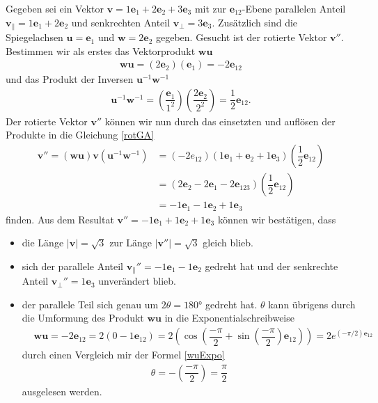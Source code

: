 \begin{beispiel} 
	Gegeben sei ein Vektor $\mathbf{v} = 1\mathbf{e}_1 + 2\mathbf{e}_2 + 3\mathbf{e}_3$ mit zur $\mathbf{e}_{12}$-Ebene parallelen Anteil $\mathbf{v_\parallel} = 1\mathbf{e}_1 + 2\mathbf{e}_2$ und senkrechten Anteil $\mathbf{v_\perp} = 3\mathbf{e}_3$. Zusätzlich sind die Spiegelachsen $\mathbf{u} = \mathbf{e}_1$ und $\mathbf{w} = 2\mathbf{e}_2$ gegeben. Gesucht ist der rotierte Vektor $\mathbf{v}''$. Bestimmen wir als erstes das Vektorprodukt $\mathbf{wu}$
	\begin{align}
		\mathbf{wu} = (2\mathbf{e}_2)(\mathbf{e}_1) = -2\mathbf{e}_{12}
	\end{align}
	und das Produkt der Inversen $\mathbf{u}^{-1}\mathbf{w}^{-1}$
	\begin{align}
		\mathbf{u}^{-1}\mathbf{w}^{-1} = (\dfrac{\mathbf{e}_1}{1^2})(\dfrac{2\mathbf{e}_2}{2^2}) = \dfrac{1}{2}\mathbf{e}_{12}.
	\end{align}
	Der rotierte Vektor $\mathbf{v}''$ können wir nun durch das einsetzten und auflösen der Produkte in die Gleichung \eqref{rotGA}
	\begin{align}
		\mathbf{v}'' = (\mathbf{wu})\mathbf{v}(\mathbf{u}^{-1}\mathbf{w}^{-1}) &= (-2e_{12})(1\mathbf{e}_1 + \mathbf{e}_2 + 1\mathbf{e}_3)(\dfrac{1}{2}\mathbf{e}_{12})\\
		&= (2\mathbf{e}_2-2\mathbf{e}_1-2\mathbf{e}_{123})(\dfrac{1}{2}\mathbf{e}_{12})\\
		&= -1\mathbf{e}_1 - 1\mathbf{e}_2 + 1\mathbf{e}_3
	\end{align}
	finden. Aus dem Resultat $\mathbf{v}''= -1\mathbf{e}_1 + 1\mathbf{e}_2 + 1\mathbf{e}_3$ können wir bestätigen, dass
	\begin{itemize}
		\item die Länge $|\mathbf{v}| = \sqrt{3}$ zur Länge $|\mathbf{v}''|=\sqrt{3}$ gleich blieb.
		\item sich der parallele Anteil $\mathbf{v_\parallel}'' = -1\mathbf{e}_1 - 1\mathbf{e}_2$ gedreht hat und der senkrechte Anteil $\mathbf{v_\perp}'' = 1\mathbf{e}_3$ unverändert blieb.
		\item der parallele Teil sich genau um $2\theta=180$° gedreht hat. $\theta$ kann übrigens durch die Umformung des Produkt $\mathbf{wu}$ in die Exponentialschreibweise
		\begin{align}
			&\mathbf{wu} = -2\mathbf{e}_{12} = 2(0-1\mathbf{e}_{12})=2(\cos(\dfrac{-\pi}{2} + \sin(\dfrac{-\pi}{2})\mathbf{e}_{12})) = 2e^{(-\pi/2)\mathbf{e}_{12}}
		\end{align}
		durch einen Vergleich mir der Formel \eqref{wuExpo}
		\begin{align}
			\theta = -(\dfrac{-\pi}{2}) = \dfrac{\pi}{2}
		\end{align}
		ausgelesen werden.
	\end{itemize}
\end{beispiel}